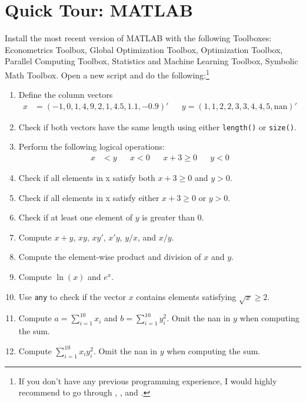 \section[Quick Tour: MATLAB]{Quick Tour: MATLAB\label{ex:QuickTourMATLAB}}
Install the most recent version of MATLAB with the following Toolboxes:
	Econometrics Toolbox,
	Global Optimization Toolbox,
	Optimization Toolbox,
	Parallel Computing Toolbox,
	Statistics and Machine Learning Toolbox,
	Symbolic Math Toolbox. Open a new script and do the following:\footnote{If you don't have any previous programming experience, I would highly recommend to go through
\textcite[Appendix A]{Brandimarte_2006_NumericalMethodsFinance},
\textcite[Appendix B]{Miranda.Fackler_2002_AppliedComputationalEconomics}, and \textcite{Pfeifer_2017_MATLABHandout}.}


\begin{enumerate}
	\item Define the column vectors
	\begin{align*}
		x &=\left( -1,0,1,4,9,2,1,4.5,1.1,-0.9\right)' && y =\left( 1,1,2,2,3,3,4,4,5,\text{nan}\right)'
	\end{align*}
	\item Check if both vectors have the same length using either \texttt{length()} or \texttt{size()}. 
	\item Perform the following logical operations:
	\begin{align*}
		x &<y &&
		x <0 &&
		x+3 \geq 0 &&
		y <0
	\end{align*}
	\item Check if all elements in x satisfy both $x+3\geq 0$ and $y>0$.
	\item Check if all elements in x satisfy either $x+3\geq 0$ or $y>0$.
	\item Check if at least one element of $y$ is greater than $0$.
	\item Compute $x+y$, $xy$, $xy'$, $x'y$, $y/x$, and $x/y$.
	\item Compute the element-wise product and division of $x$ and $y$.
	\item Compute $\ln (x)$ and $e^x$.
	\item Use \texttt{any} to check if the vector $x$ contains elements	satisfying $\sqrt{x}\geq 2$.
	\item Compute
	$a =\sum_{i=1}^{10}x_{i}$ and $b =\sum_{i=1}^{10}y_{i}^{2}$. Omit the nan in $y$ when computing the sum.
	\item Compute $\sum_{i=1}^{10}x_{i}y_{i}^{2}$. Omit the nan in $y$ when computing the sum.

\end{enumerate}
